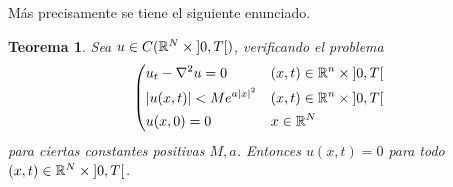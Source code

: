 \documentclass{article}
\newcommand{\realNumbers}{\mathbb{R}}
\newtheorem{theorem}{Teorema}
\newcommand{\leftOpenInterval}{\left]}
\newcommand{\rightOpenInterval}{\right[}
\newcommand{\leftClosedInterval}{\left[}
\newcommand{\rightClosedInterval}{\right]}
\newcommand{\interval}[3]{%
  \ifstrequal{#1}{oo}{%
    \leftOpenInterval #2, #3 \rightOpenInterval%
  }{%
    \ifstrequal{#1}{co}{%
      \leftClosedInterval #2, #3 \rightOpenInterval%
    }{%
      \ifstrequal{#1}{oc}{
        \leftOpenInterval #2, #3 \rightClosedInterval%
      }{%
        \ifstrequal{#1}{cc}{
          \leftClosedInterval #2, #3 \rightClosedInterval
        }{%
        }%
      }%
    }%
  }%
}
\theoremstyle{remark}
\begin{document}
Más precisamente se tiene el siguiente enunciado.

\begin{theorem}
  Sea \(u \in C(\realNumbers^N \times \interval{oo}{0}{T})\), verificando el problema
  \begin{align}
    \left(
      \begin{aligned}        
        &u_t - \laplacian u = 0
          && (x, t) \in \realNumbers^n \times \interval{oo}{0}{T}
        \\
        & \abs{u(x, t)} < M e^{a \abs{x}^2}
          && (x, t) \in \realNumbers^n \times \interval{oo}{0}{T}
        \\
        &u(x, 0) = 0
          && x \in \realNumbers^N
      \end{aligned}
    \right.
  \end{align}
  para ciertas constantes positivas \(M, a\).
  Entonces \(u(x, t) = 0\) para todo \((x, t) \in \realNumbers^N \times \interval{oo}{0}{T}\).
\end{theorem}
\end{document}

